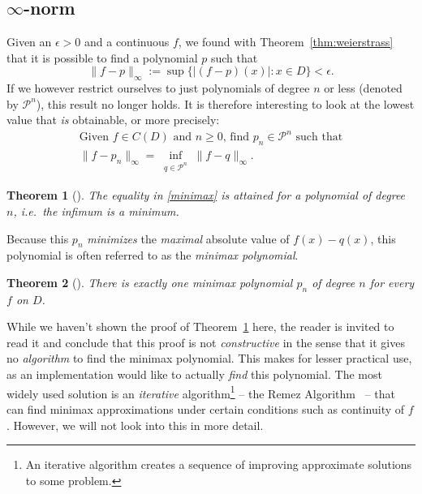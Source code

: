 \documentclass[11pt]{report}
\newtheorem{theorem}{Theorem}
\theoremstyle{definition}
\theoremstyle{remark}
\newcommand{\e}{\varepsilon}
\renewcommand{\P}{\mathcal{P}}
\renewcommand{\e}{\epsilon}
\begin{document}
\subsection{$\infty$-norm}
Given an $\e > 0$ and a continuous $f$, we found with Theorem~\ref{thm:weierstrass} that it is possible to find a polynomial $p$ such that
\[
  \|f - p\|_\infty := \sup \{ |(f-p)(x)|: x \in D \} < \e.
\]
If we however restrict ourselves to just polynomials of degree $n$ or less (denoted by $\P^n$), this result no longer holds. It is therefore interesting to look at the lowest value that \emph{is} obtainable, or more precisely:
\begin{gather}
  \text{Given $f \in C(D)$ and $n \geq 0$, find $p_n \in \P^n$ such that} \nonumber\\
  \|f - p_n\|_\infty = \inf_{\substack{q \in \P^n}}\|f - q\|_\infty.
  \label{minimax}
\end{gather}
\begin{theorem}[{\cite[Thm.~8.2]{NA}}]
  \label{thm:minimaxexists}
  The equality in \eqref{minimax} is attained for a polynomial of degree $n$, i.e.~the infimum is a minimum.
\end{theorem}
Because this $p_n$ \emph{minimizes} the \emph{maximal} absolute value of $f(x) - q(x)$, this polynomial is often referred to as the \emph{minimax polynomial}.
\begin{theorem}[{\cite[Thm.~8.5]{NA}}]
  There is exactly one minimax polynomial $p_n$ of degree $n$ for every $f$ on $D$.
\end{theorem}

While we haven't shown the proof of Theorem~\ref{thm:minimaxexists} here, the reader is invited to read it and conclude that this proof is not \emph{constructive} in the sense that it gives no \emph{algorithm} to find the minimax polynomial. This makes for lesser practical use, as an implementation would like to actually \emph{find} this polynomial. The most widely used solution is an \emph{iterative} algorithm\footnote{An iterative algorithm creates a sequence of improving approximate solutions to some problem.} -- the Remez Algorithm~\cite{remez} -- that can find minimax approximations under certain conditions such as continuity of $f$. However, we will not look into this in more detail.
\end{document}
